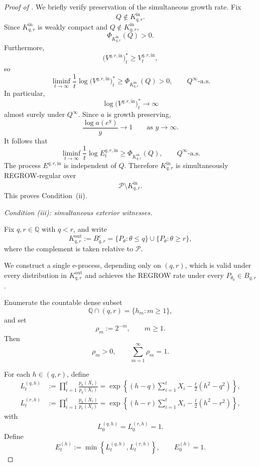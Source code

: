 \documentclass[12pt]{article}
\theoremstyle{spaced}
\theoremstyle{remark}
\begin{document}
\begin{proof}[Proof of ]
We briefly verify preservation of the simultaneous growth rate.
Fix
\[
    Q\notin K_{q,r}^{\mathrm{in}}.
\]
Since $K_{q,r}^{\mathrm{in}}$ is weakly compact and
$Q\notin K_{q,r}^{\mathrm{in}}$,
\[
    \Phi_{K_{q,r}^{\mathrm{in}}}(Q)>0.
\]
Furthermore,
\[
    \bigl(V^{q,r,\mathrm{in}}\bigr)_t^*
    \ge
    V_t^{q,r,\mathrm{in}},
\]
so
\[
    \liminf_{t\to\infty}
    \frac1t
    \log
    \bigl(V^{q,r,\mathrm{in}}\bigr)_t^*
    \ge
    \Phi_{K_{q,r}^{\mathrm{in}}}(Q)
    >0,
    \qquad
    Q^\infty\text{-a.s.}
\]
In particular,
\[
    \log
    \bigl(V^{q,r,\mathrm{in}}\bigr)_t^*
    \longrightarrow\infty
\]
almost surely under $Q^\infty$. Since $a$ is growth preserving,
\[
    \frac{\log a(e^y)}{y}\longrightarrow1
    \qquad\text{as }y\to\infty.
\]
It follows that
\[
    \liminf_{t\to\infty}
    \frac1t
    \log E_t^{q,r,\mathrm{in}}
    \ge
    \Phi_{K_{q,r}^{\mathrm{in}}}(Q),
    \qquad
    Q^\infty\text{-a.s.}
\]
The process $E^{q,r,\mathrm{in}}$ is independent of $Q$.
Therefore $K_{q,r}^{\mathrm{in}}$ is simultaneously
REGROW-regular over
\[
    \mathcal P\setminus K_{q,r}^{\mathrm{in}}.
\]
This proves Condition~\textup{(ii)}.

\medskip

\noindent
\emph{Condition \textup{(iii)}: simultaneous exterior
witnesses.}

Fix $q,r\in\mathbb Q$ with $q<r$, and write
\[
    K_{q,r}^{\mathrm{out}}
    :=
    B_{q,r}^c
    =
    \{P_\theta:\theta\le q\}
    \cup
    \{P_\theta:\theta\ge r\},
\]
where the complement is taken relative to $\mathcal P$.

We construct a single e-process, depending only on $(q,r)$,
which is valid under every distribution in
$K_{q,r}^{\mathrm{out}}$ and achieves the REGROW rate under
every $P_{\theta_0}\in B_{q,r}$.

Enumerate the countable dense subset
\[
    \mathbb Q\cap(q,r)
    =
    \{h_m:m\ge1\},
\]
and set
\[
    \rho_m:=2^{-m},
    \qquad m\ge1.
\]
Then
\[
    \rho_m>0,
    \qquad
    \sum_{m=1}^\infty\rho_m=1.
\]

For each $h\in(q,r)$, define
\begin{align}
    L_t^{(q,h)}
    &:=
    \prod_{i=1}^t
    \frac{p_h(X_i)}{p_q(X_i)}
    =
    \exp\left\{
        (h-q)\sum_{i=1}^tX_i
        -
        \frac t2(h^2-q^2)
    \right\},
    \label{eq:gaussian-left-lr}\\
    L_t^{(r,h)}
    &:=
    \prod_{i=1}^t
    \frac{p_h(X_i)}{p_r(X_i)}
    =
    \exp\left\{
        (h-r)\sum_{i=1}^tX_i
        -
        \frac t2(h^2-r^2)
    \right\},
    \label{eq:gaussian-right-lr}
\end{align}
with
\[
    L_0^{(q,h)}=L_0^{(r,h)}=1.
\]
Define
\[
    E_t^{(h)}
    :=
    \min\left\{
        L_t^{(q,h)},
        L_t^{(r,h)}
    \right\},
    \qquad
    E_0^{(h)}=1.
\]


\end{proof}
\end{document}
